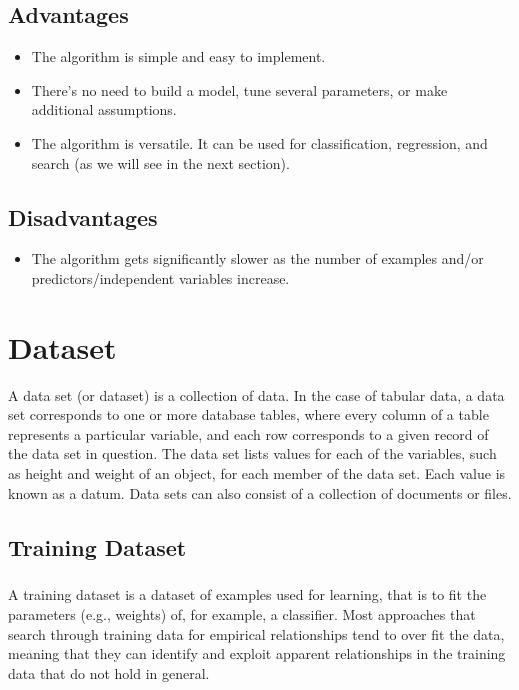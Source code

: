 \documentclass{report}
\begin{document}
\section{Advantages}
\begin{itemize}
\item The algorithm is simple and easy to implement.  
\item There’s no need to build a model, tune several parameters, or make additional assumptions.
\item The algorithm is versatile. It can be used for classification, regression, and search (as we will see in the next section).
\end{itemize}

\section{Disadvantages}
\begin{itemize}
\item The algorithm gets significantly slower as the number of examples and/or predictors/independent variables increase.
\end{itemize}


\chapter{Dataset}
A data set (or dataset) is a collection of data. In the case of tabular data, a data set corresponds to one or more database tables, where every column of a table represents a particular variable, and each row corresponds to a given record of the data set in question. The data set lists values for each of the variables, such as height and weight of an object, for each member of the data set. Each value is known as a datum. Data sets can also consist of a collection of documents or files.
\section{Training Dataset}
\paragraph{}A training dataset is a dataset of examples used for learning, that is to fit the parameters (e.g., weights) of, for example, a classifier.
Most approaches that search through training data for empirical relationships tend to over fit the data, meaning that they can identify and exploit apparent relationships in the training data that do not hold in general. 
\end{document}
